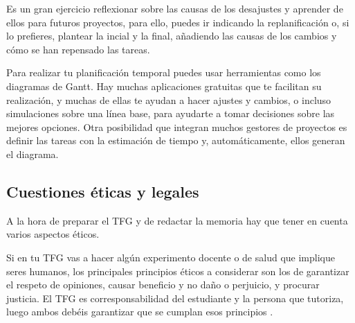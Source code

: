 Es un gran ejercicio reflexionar sobre las causas de los desajustes y aprender de ellos para futuros proyectos, para ello, puedes ir indicando la replanificación o, si lo prefieres, plantear la incial y la final, añadiendo las causas de los cambios y cómo se han repensado las tareas.

Para realizar tu planificación temporal puedes usar herramientas como los diagramas de Gantt. Hay muchas aplicaciones gratuitas que te facilitan su realización, y muchas de ellas te ayudan a hacer ajustes y cambios, o incluso simulaciones sobre una línea base, para ayudarte a tomar decisiones sobre las mejores opciones. Otra posibilidad que integran muchos gestores de proyectos es definir las tareas con la estimación de tiempo y, automáticamente, ellos generan el diagrama.


\subsection{Cuestiones éticas y legales}%

A la hora de preparar el TFG y de redactar la memoria hay que tener en cuenta varios aspectos éticos.

Si en tu TFG vas a hacer algún experimento docente o de salud que implique seres humanos, los principales principios éticos a considerar son los de garantizar el respeto de opiniones, causar beneficio y no daño o perjuicio, y procurar justicia. El TFG es corresponsabilidad del estudiante y la persona que tutoriza, luego ambos debéis garantizar que se cumplan esos principios \cite{EticaCantabria}. 

